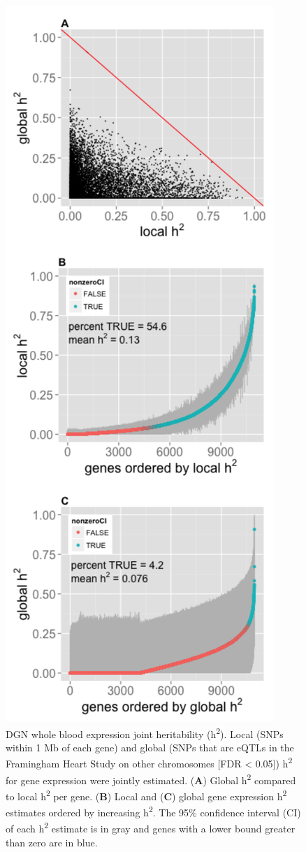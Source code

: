 \documentclass[]{article}
\begin{document}
\begin{figure}[htbp]
\centering
\includegraphics{GenArch_manuscript_files/figure-latex/jointH2-1.pdf}
\caption{DGN whole blood expression joint heritability
(h\textsuperscript{2}). Local (SNPs within 1 Mb of each gene) and global
(SNPs that are eQTLs in the Framingham Heart Study on other chromosomes
{[}FDR \textless{} 0.05{]}) h\textsuperscript{2} for gene expression
were jointly estimated. (\textbf{A}) Global h\textsuperscript{2}
compared to local h\textsuperscript{2} per gene. (\textbf{B}) Local and
(\textbf{C}) global gene expression h\textsuperscript{2} estimates
ordered by increasing h\textsuperscript{2}. The 95\% confidence interval
(CI) of each h\textsuperscript{2} estimate is in gray and genes with a
lower bound greater than zero are in blue.}
\end{figure}
\end{document}
